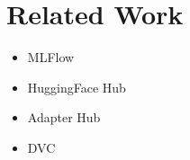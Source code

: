\section{Related Work}
\begin{itemize}
    \item MLFlow
    \item HuggingFace Hub
    \item Adapter Hub
    \item DVC
\end{itemize}